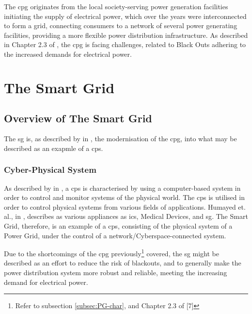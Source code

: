 The \acrlong{cpg} originates from the local society-serving power generation facilities initiating the supply of electrical power, which over the years were interconnected to form a grid, connecting consumers to a network of several power generating facilities, providing a more flexible power distribution infrastructure. 
As described in Chapter 2.3 of \cite{Rihan2018} %
, the \acrlong{cpg} is facing challenges, related to Black Outs adhering to the increased demands for electrical power. 


\section{The Smart Grid}
\subsection{Overview of The Smart Grid}

The \acrfull{sg} is, as described by \citeauthor{humayed2017cyber} in \cite{humayed2017cyber}, the modernisation of the \acrfull{cpg}, into what may be described as an exapmle of a \acrfull{cps}.

\subsubsection{Cyber-Physical System}

As described by \citeauthor{humayed2017cyber} in \cite{humayed2017cyber}, a \acrfull{cps} is characterised by using a computer-based system in order to control and monitor systems of the physical world. The \acrshort{cps} is utilised in order to control physical systems from various fields of applications. Humayed et. al., in \cite{humayed2017cyber}, describes as various appliances as \acrfull{ics}, Medical Devices, and \acrlong{sg}.
The Smart Grid, therefore, is an example of a \acrfull{cps}, consisting of the physical system of a Power Grid, under the control of a network/Cyberspace-connected system. 

Due to the shortcomings of the \acrshort{cpg} previously\footnote{Refer to subsection \ref{subsec:PG-char}, and Chapter 2.3 of [7]} covered, the \acrshort{sg} might be described as an effort to reduce the risk of blackouts, and to generally make the power distribution system more robust and reliable, meeting the increasing demand for electrical power.
 

